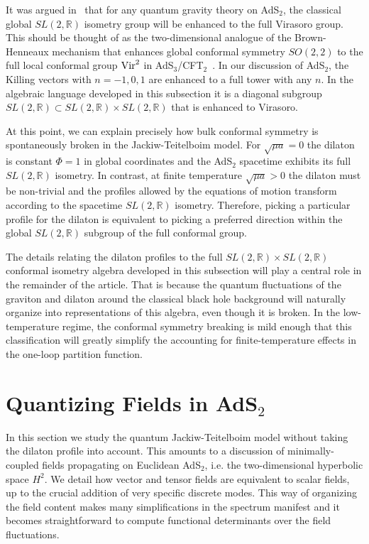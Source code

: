 \documentclass[12pt]{article}
\begin{document}
It was argued in~\cite{Strominger:1998yg} that for any quantum gravity theory on AdS$_2$, the classical global $SL(2,\mathbb{R})$ isometry group will be enhanced to the full Virasoro group.  This should be thought of as the two-dimensional analogue of the Brown-Henneaux mechanism that enhances 
global conformal symmetry $SO(2,2)$ to the full local conformal group ${\rm Vir}^2$ in AdS$_3$/CFT$_2$~\cite{Brown:1986nw}. In our discussion of AdS$_2$, the Killing vectors with $n=-1,0,1$ are enhanced to a full tower with any $n$. In the algebraic language developed in this subsection it is a diagonal subgroup
$SL(2,\mathbb{R})\subset SL(2,\mathbb{R}) \times SL(2,\mathbb{R})$ that is enhanced to Virasoro. 

At this point, we can explain precisely how bulk conformal symmetry is spontaneously broken in the Jackiw-Teitelboim model.  
For $\sqrt{\mu a} = 0$ the dilaton is constant $\Phi=1$ in global coordinates and the AdS$_2$ spacetime exhibits its full $SL(2,\mathbb{R})$ isometry. In contrast, at finite temperature  $\sqrt{\mu a} > 0$ the dilaton must be non-trivial and the profiles allowed by the equations of motion transform according to the spacetime $SL(2,\mathbb{R})$ isometry. Therefore, picking a particular profile for the dilaton is equivalent to picking a preferred direction within the global $SL(2,\mathbb{R})$ subgroup of the full conformal group.

The details relating the dilaton profiles to the full $SL(2,\mathbb{R}) \times SL(2,\mathbb{R})$ conformal isometry algebra developed in this subsection will play a central role in the remainder of the article. That is because the quantum fluctuations of the graviton and dilaton around the classical black hole background will naturally organize into representations of this algebra, even though it is broken.  In the low-temperature regime, the conformal symmetry breaking is mild enough that this classification will greatly simplify the accounting for finite-temperature effects in the one-loop partition function.

\section{Quantizing Fields in \texorpdfstring{AdS$_2$}{AdS2}}
\label{sec:quant}

In this section we study the quantum Jackiw-Teitelboim model without taking the dilaton profile into account. This amounts to a discussion of 
minimally-coupled fields propagating on Euclidean AdS$_2$, i.e. the two-dimensional hyperbolic space $H^2$.  We detail how vector and tensor fields are equivalent to scalar fields, up to the crucial addition of very specific discrete modes.  This way of organizing the field content makes many simplifications in the spectrum manifest and it becomes straightforward to 
compute functional determinants over the field fluctuations.  
\end{document}
